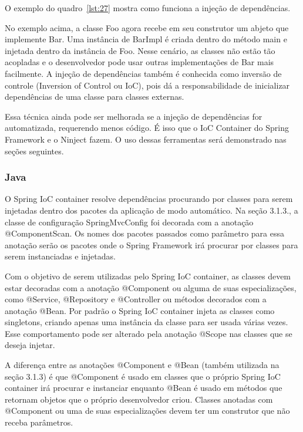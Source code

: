 \documentclass[a4paper,12pt]{article}
\newcommand{\javacode}[3] {
	
}
\begin{document}
O exemplo do quadro~\ref{lst:27} mostra como funciona a injeção de dependências.

\javacode{code/27.txt}{Exemplo de classes fracamente acopladas}{lst:27}

No exemplo acima, a classe Foo agora recebe em seu construtor um abjeto que implemente Bar. Uma instância de BarImpl é criada dentro do método main e injetada dentro da instância de Foo. Nesse cenário, as classes não estão tão acopladas e o desenvolvedor pode usar outras implementações de Bar mais facilmente. A injeção de dependências também é conhecida como inversão de controle (Inversion of Control ou IoC), pois dá a responsabilidade de inicializar dependências de uma classe para classes externas. 

Essa técnica ainda pode ser melhorada se a injeção de dependências for automatizada, requerendo menos código. É isso que o IoC Container do Spring Framework e o Ninject fazem. O uso dessas ferramentas será demonstrado nas seções seguintes.

\subsubsection{Java}

O Spring IoC container resolve dependências procurando por classes para serem injetadas dentro dos pacotes da aplicação de modo automático. Na seção 3.1.3., a classe de configuração SpringMvcConfig foi decorada com a anotação @ComponentScan. Os nomes dos pacotes passados como parâmetro para essa anotação serão os pacotes onde o Spring Framework irá procurar por classes para serem instanciadas e injetadas.

Com o objetivo de serem utilizadas pelo Spring IoC container, as classes devem estar decoradas com a anotação @Component ou alguma de suas especializações, como @Service, @Repository e @Controller ou métodos decorados com a anotação @Bean. Por padrão o Spring IoC container injeta as classes como singletons, criando apenas uma instância da classe para ser usada várias vezes. Esse comportamento pode ser alterado pela anotação @Scope nas classes que se deseja injetar.

A diferença entre as anotações @Component e @Bean (também utilizada na seção 3.1.3) é que @Component é usado em classes que o próprio Spring IoC container irá procurar e instanciar enquanto @Bean é usado em métodos que retornam objetos que o próprio desenvolvedor criou. Classes anotadas com @Component ou uma de suas especializações devem ter um construtor que não receba parâmetros.
\end{document}

